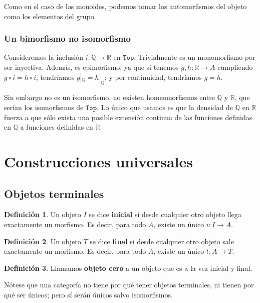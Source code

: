 \documentclass[11pt]{article}
\theoremstyle{plain}
\theoremstyle{definition}
\newtheorem{definition}{Definición}
\theoremstyle{remark}
\begin{document}
Como en el caso de los monoides, podemos tomar los automorfismos del
objeto como los elementos del grupo.

\subsubsection{Un bimorfismo no isomorfismo}
\label{sec:orgd3bfff5}
Consideremos la inclusión \(i\colon \mathbb{Q} \to \mathbb{R}\) en \(\mathtt{Top}\). Trivialmente es un 
monomorfismo por ser inyectiva. Además, es epimorfismo, ya que si 
tenemos \(g,h \colon \mathbb{R} \to A\) cumpliendo \(g \circ i = h \circ
i\), tendríamos \(g|_{\mathbb{Q}} = h|_{\mathbb{Q}}\);
y por continuidad, tendríamos \(g = h\).

Sin embargo no es un isomorfismo, no existen homeomorfismos entre
\(\mathbb{Q}\) y \(\mathbb{R}\), que serían los isomorfismos de \(\mathtt{Top}\). Lo único que usamos es
que la densidad de \(\mathbb{Q}\) en \(\mathbb{R}\) fuerza a que sólo exista una posible
extensión continua de las funciones definidas en \(\mathbb{Q}\) a funciones
definidas en \(\mathbb{R}\).

\section{Construcciones universales}
\label{sec:orga91269d}
\subsection{Objetos terminales}
\label{sec:orge2e71c0}
\begin{definition}
Un objeto \(I\) se dice \textbf{inicial} si desde cualquier otro objeto llega exactamente
un morfismo. Es decir, para todo \(A\), existe un único \(i \colon I \to A\).
\end{definition}

\begin{definition}
Un objeto \(T\) se dice \textbf{final} si desde cualquier otro objeto sale exactamente
un morfismo. Es decir, para todo \(A\), existe un único \(t\colon A \to T\).
\end{definition}

\begin{definition}
Llamamos \textbf{objeto cero} a un objeto que es a la vez inicial y final.
\end{definition}

Nótese que una categoría no tiene por qué tener objetos terminales, ni tienen
por qué ser únicos; pero sí serán únicos salvo isomorfismos.
\end{document}
